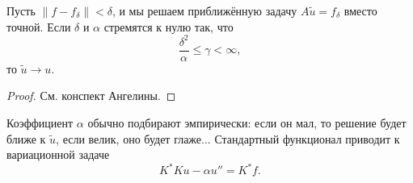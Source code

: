 \documentclass{trlnotes}
\begin{document}
    \begin{thm}
        Пусть $\|f - f_{\delta}\| < \delta$, и мы решаем приближённую задачу $A\tilde{u} = f_{\delta}$ вместо точной. Если $\delta$ и $\alpha$ стремятся к нулю так, что 
        \[
            \dfrac{\delta^2}{\alpha} \leqslant \gamma < \infty,
        \]
        то $\tilde{u} \to u$.
        \begin{proof}
            См. конспект Ангелины.
        \end{proof}
    \end{thm}

    Коэффициент $\alpha$ обычно подбирают эмпирически: если он мал, то решение будет ближе к $\tilde{u}$, если велик, оно будет глаже... Стандартный функционал приводит к вариационной задаче
    \[
        K^*Ku - \alpha u'' = K^* f.
    \]
\end{document}
